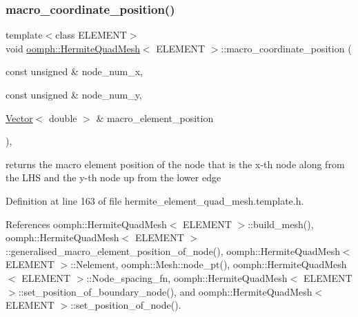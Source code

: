 \subsubsection{\texorpdfstring{macro\+\_\+coordinate\+\_\+position()}{macro\_coordinate\_position()}}
{\footnotesize\ttfamily template$<$class E\+L\+E\+M\+E\+NT$>$ \\
void \hyperlink{classoomph_1_1HermiteQuadMesh}{oomph\+::\+Hermite\+Quad\+Mesh}$<$ E\+L\+E\+M\+E\+NT $>$\+::macro\+\_\+coordinate\+\_\+position (\begin{DoxyParamCaption}\item[{const unsigned \&}]{node\+\_\+num\+\_\+x,  }\item[{const unsigned \&}]{node\+\_\+num\+\_\+y,  }\item[{\hyperlink{classoomph_1_1Vector}{Vector}$<$ double $>$ \&}]{macro\+\_\+element\+\_\+position }\end{DoxyParamCaption})\hspace{0.3cm}{\ttfamily [inline]}, {\ttfamily [private]}}



returns the macro element position of the node that is the x-\/th node along from the L\+HS and the y-\/th node up from the lower edge 



Definition at line 163 of file hermite\+\_\+element\+\_\+quad\+\_\+mesh.\+template.\+h.



References oomph\+::\+Hermite\+Quad\+Mesh$<$ E\+L\+E\+M\+E\+N\+T $>$\+::build\+\_\+mesh(), oomph\+::\+Hermite\+Quad\+Mesh$<$ E\+L\+E\+M\+E\+N\+T $>$\+::generalised\+\_\+macro\+\_\+element\+\_\+position\+\_\+of\+\_\+node(), oomph\+::\+Hermite\+Quad\+Mesh$<$ E\+L\+E\+M\+E\+N\+T $>$\+::\+Nelement, oomph\+::\+Mesh\+::node\+\_\+pt(), oomph\+::\+Hermite\+Quad\+Mesh$<$ E\+L\+E\+M\+E\+N\+T $>$\+::\+Node\+\_\+spacing\+\_\+fn, oomph\+::\+Hermite\+Quad\+Mesh$<$ E\+L\+E\+M\+E\+N\+T $>$\+::set\+\_\+position\+\_\+of\+\_\+boundary\+\_\+node(), and oomph\+::\+Hermite\+Quad\+Mesh$<$ E\+L\+E\+M\+E\+N\+T $>$\+::set\+\_\+position\+\_\+of\+\_\+node().

\mbox{\label{classoomph_1_1HermiteQuadMesh_a06599366634a9ac89e25a0f110d0a35b}} 
